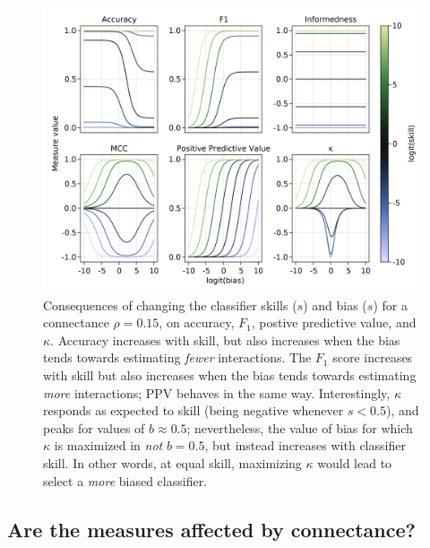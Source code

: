 \documentclass[11pt]{article}
\makeatletter
\def\maxwidth{\ifdim\Gin@nat@width>\linewidth\linewidth
\else\Gin@nat@width\fi}
\let\Oldincludegraphics\includegraphics
\renewcommand{\includegraphics}[1]{\Oldincludegraphics[width=\maxwidth]{#1}}
\makeatother
\begin{document}
\begin{figure}
\hypertarget{fig:bias}{%
\centering
\includegraphics{figures/changing-bias.png}
\caption{Consequences of changing the classifier skills (\(s\)) and bias
(\(s\)) for a connectance \(\rho=0.15\), on accuracy, \(F_1\), postive
predictive value, and \(\kappa\). Accuracy increases with skill, but
also increases when the bias tends towards estimating \emph{fewer}
interactions. The \(F_1\) score increases with skill but also increases
when the bias tends towards estimating \emph{more} interactions; PPV
behaves in the same way. Interestingly, \(\kappa\) responds as expected
to skill (being negative whenever \(s < 0.5\)), and peaks for values of
\(b \approx 0.5\); nevertheless, the value of bias for which \(\kappa\)
is maximized in \emph{not} \(b=0.5\), but instead increases with
classifier skill. In other words, at equal skill, maximizing \(\kappa\)
would lead to select a \emph{more} biased classifier.}\label{fig:bias}
}
\end{figure}

\hypertarget{are-the-measures-affected-by-connectance}{%
\subsection{Are the measures affected by
connectance?}\label{are-the-measures-affected-by-connectance}}
\end{document}
